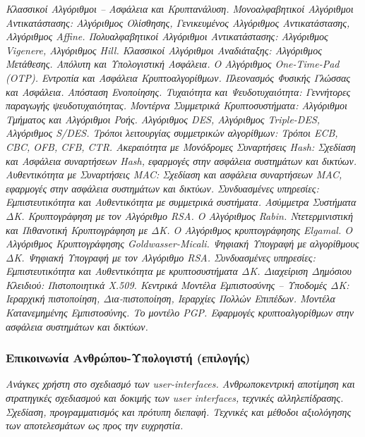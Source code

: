 \emph{Κλασσικοί Αλγόριθμοι -- Ασφάλεια και Κρυπτανάλυση. Μονοαλφαβητικοί
Αλγόριθμοι Αντικατάστασης: Αλγόριθμος Ολίσθησης, Γενικευμένος Αλγόριθμος
Αντικατάστασης, Αλγόριθμος Affine. Πολυαλφαβητικοί Αλγόριθμοι
Αντικατάστασης: Αλγόριθμος Vigenere, Αλγόριθμος Hill. Κλασσικοί
Αλγόριθμοι Αναδιάταξης: Αλγόριθμος Μετάθεσης. Απόλυτη και Υπολογιστική
Ασφάλεια. Ο Αλγόριθμος One-Time-Pad (OTP). Εντροπία και Ασφάλεια
Κρυπτοαλγορίθμων. Πλεονασμός Φυσικής Γλώσσας και Ασφάλεια. Απόσταση
Ενοποίησης. Τυχαιότητα και Ψευδοτυχαιότητα: Γεννήτορες παραγωγής
ψευδοτυχαιότητας. Μοντέρνα Συμμετρικά Κρυπτοσυστήματα: Αλγόριθμοι
Τμήματος και Αλγόριθμοι Ροής. Αλγόριθμος DES, Αλγόριθμος Triple-DES,
Αλγόριθμος S/DES. Tρόποι λειτουργίας συμμετρικών αλγορίθμων: Τρόποι ECB,
CBC, OFB, CFB, CTR. Ακεραιότητα με Μονόδρομες Συναρτήσεις Hash: Σχεδίαση
και Ασφάλεια συναρτήσεων Hash, εφαρμογές στην ασφάλεια συστημάτων και
δικτύων. Αυθεντικότητα με Συναρτήσεις MAC: Σχεδίαση και ασφάλεια
συναρτήσεων MAC, εφαρμογές στην ασφάλεια συστημάτων και δικτύων.
Συνδυασμένες υπηρεσίες: Εμπιστευτικότητα και Αυθεντικότητα με συμμετρικά
συστήματα. Ασύμμετρα Συστήματα ΔΚ. Κρυπτογράφηση με τον Αλγόριθμο RSA. O
Αλγόριθμος Rabin. Ντετερμινιστική και Πιθανοτική Κρυπτογράφηση με ΔΚ. Ο
Αλγόριθμος κρυπτογράφησης Elgamal. Ο Αλγόριθμος Κρυπτογράφησης
Goldwasser-Micali. Ψηφιακή Υπογραφή με αλγορίθμους ΔΚ. Ψηφιακή Υπογραφή
με τον Αλγόριθμο RSA. Συνδυασμένες υπηρεσίες: Εμπιστευτικότητα και
Αυθεντικότητα με κρυπτοσυστήματα ΔΚ. Διαχείριση Δημόσιου Κλειδιού:
Πιστοποιητικά Χ.509. Κεντρικά Μοντέλα Εμπιστοσύνης -- Υποδομές ΔΚ:
Ιεραρχική πιστοποίηση, Δια-πιστοποίηση, Ιεραρχίες Πολλών Επιπέδων.
Μοντέλα Κατανεμημένης Εμπιστοσύνης. Το μοντέλο PGP. Εφαρμογές
κρυπτοαλγορίθμων στην ασφάλεια συστημάτων και δικτύων.}

\hypertarget{ux3b5ux3c0ux3b9ux3baux3bfux3b9ux3bdux3c9ux3bdux3afux3b1-ux3b1ux3bdux3b8ux3c1ux3ceux3c0ux3bfux3c5-ux3c5ux3c0ux3bfux3bbux3bfux3b3ux3b9ux3c3ux3c4ux3ae-ux3b5ux3c0ux3b9ux3bbux3bfux3b3ux3aeux3c2}{%
\subsubsection{Επικοινωνία Ανθρώπου-Υπολογιστή
(επιλογής)}\label{ux3b5ux3c0ux3b9ux3baux3bfux3b9ux3bdux3c9ux3bdux3afux3b1-ux3b1ux3bdux3b8ux3c1ux3ceux3c0ux3bfux3c5-ux3c5ux3c0ux3bfux3bbux3bfux3b3ux3b9ux3c3ux3c4ux3ae-ux3b5ux3c0ux3b9ux3bbux3bfux3b3ux3aeux3c2}}

\emph{Ανάγκες χρήστη στο σχεδιασμό των user-interfaces. Ανθρωποκεντρική
αποτίμηση και στρατηγικές σχεδιασμού και δοκιμής των user interfaces,
τεχνικές αλληλεπίδρασης. Σχεδίαση, προγραμματισμός και πρότυπη διεπαφή.
Τεχνικές και μέθοδοι αξιολόγησης των αποτελεσμάτων ως προς την
ευχρηστία.}

